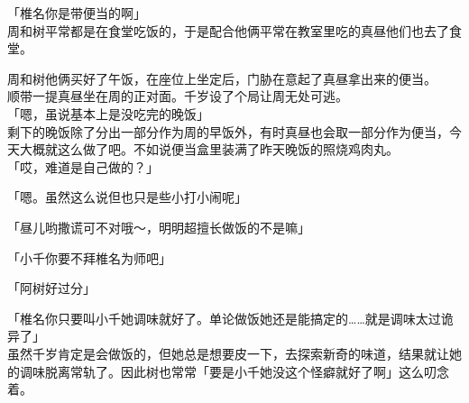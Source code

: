 「椎名你是带便当的啊」\\

周和树平常都是在食堂吃饭的，于是配合他俩平常在教室里吃的真昼他们也去了食堂。

周和树他俩买好了午饭，在座位上坐定后，门胁在意起了真昼拿出来的便当。\\

顺带一提真昼坐在周的正对面。千岁设了个局让周无处可逃。\\

「嗯，虽说基本上是没吃完的晚饭」\\

剩下的晚饭除了分出一部分作为周的早饭外，有时真昼也会取一部分作为便当，今天大概就这么做了吧。不如说便当盒里装满了昨天晚饭的照烧鸡肉丸。\\

「哎，难道是自己做的？」

「嗯。虽然这么说但也只是些小打小闹呢」

「昼儿哟撒谎可不对哦～，明明超擅长做饭的不是嘛」

「小千你要不拜椎名为师吧」

「阿树好过分」

「椎名你只要叫小千她调味就好了。单论做饭她还是能搞定的……就是调味太过诡异了」\\

虽然千岁肯定是会做饭的，但她总是想要皮一下，去探索新奇的味道，结果就让她的调味脱离常轨了。因此树也常常「要是小千她没这个怪癖就好了啊」这么叨念着。\\

